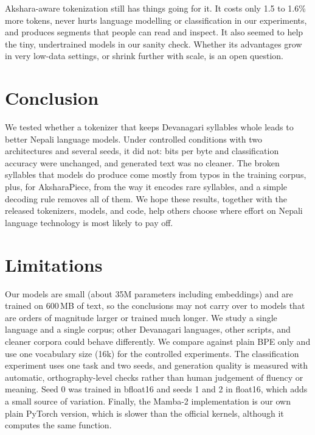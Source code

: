 \documentclass[11pt]{article}
\newcommand{\ap}{AksharaPiece}
\begin{document}
Akshara-aware tokenization still has things going for it. It costs only 1.5 to 1.6\% more tokens, never hurts language modelling or classification in our experiments, and produces segments that people can read and inspect. It also seemed to help the tiny, undertrained models in our sanity check. Whether its advantages grow in very low-data settings, or shrink further with scale, is an open question.

\section{Conclusion}

We tested whether a tokenizer that keeps Devanagari syllables whole leads to better Nepali language models. Under controlled conditions with two architectures and several seeds, it did not: bits per byte and classification accuracy were unchanged, and generated text was no cleaner. The broken syllables that models do produce come mostly from typos in the training corpus, plus, for \ap{}, from the way it encodes rare syllables, and a simple decoding rule removes all of them. We hope these results, together with the released tokenizers, models, and code, help others choose where effort on Nepali language technology is most likely to pay off.

\section*{Limitations}

Our models are small (about 35M parameters including embeddings) and are trained on 600\,MB of text, so the conclusions may not carry over to models that are orders of magnitude larger or trained much longer. We study a single language and a single corpus; other Devanagari languages, other scripts, and cleaner corpora could behave differently. We compare against plain BPE only and use one vocabulary size (16k) for the controlled experiments. The classification experiment uses one task and two seeds, and generation quality is measured with automatic, orthography-level checks rather than human judgement of fluency or meaning. Seed 0 was trained in bfloat16 and seeds 1 and 2 in float16, which adds a small source of variation. Finally, the Mamba-2 implementation is our own plain PyTorch version, which is slower than the official kernels, although it computes the same function.
\end{document}
